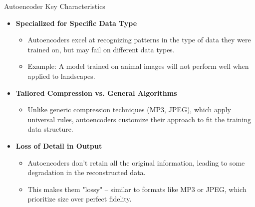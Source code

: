 \documentclass[serif, aspectratio=169]{beamer}
\begin{document}
\begin{frame}{Autoencoder Key Characteristics}
\small
     
    \begin{itemize}
        \item \textbf{Specialized for Specific Data Type}
        \begin{itemize}
            \item Autoencoders excel at recognizing patterns in the type of data they were trained on, but may fail on different data types.
            \item Example: A model trained on animal images will not perform well when applied to landscapes.
        \end{itemize}
        
        \vspace{0.25cm}
        
        \item \textbf{Tailored Compression vs. General Algorithms}
        \begin{itemize}
            \item Unlike generic compression techniques (MP3, JPEG), which apply universal rules, autoencoders customize their approach to fit the training data structure.
        \end{itemize}
        
        \vspace{0.25cm}
        
        \item \textbf{Loss of Detail in Output}
        \begin{itemize}
            \item Autoencoders don’t retain all the original information, leading to some degradation in the reconstructed data.
            \item This makes them "lossy" – similar to formats like MP3 or JPEG, which prioritize size over perfect fidelity.
        \end{itemize}
    \end{itemize}
    

\end{frame}
\end{document}
